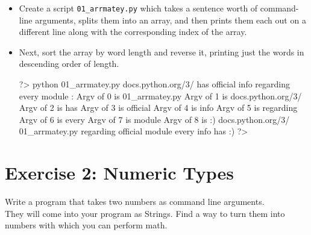 \documentclass{42-en}
\begin{document}
\begin{itemize}

\item Create a script \texttt{01\_arrmatey.py} which takes a sentence worth of command-line arguments, splits them into an array, and then prints them each out on a different line along with the corresponding index of the array.
\item Next, sort the array by word length and reverse it, printing just the words in descending order of length.

\begin{42console}
	?> python 01_arrmatey.py docs.python.org/3/ has official info regarding every module :\)
	Argv of 0 is 01_arrmatey.py
	Argv of 1 is docs.python.org/3/
	Argv of 2 is has
	Argv of 3 is official
	Argv of 4 is info
	Argv of 5 is regarding
	Argv of 6 is every
	Argv of 7 is module
	Argv of 8 is :)
	docs.python.org/3/
	01_arrmatey.py
	regarding
	official
	module
	every
	info
	has
	:)
	?>
\end{42console}

\end{itemize}

\nextexercice
\newpage


\chapter{Exercise 2: Numeric Types}
\makeheaderfiles

Write a program that takes two numbers as command line arguments.\\

They will come into your program as Strings. Find a way to turn them into numbers with which you can perform math.\\
\end{document}
